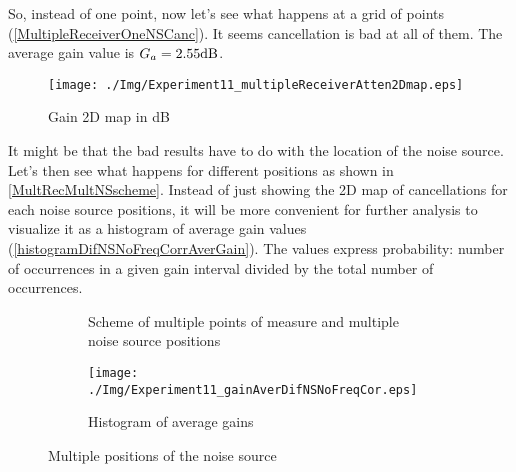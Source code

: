 So, instead of one point, now let's see what happens at a grid of points (\autoref{MultipleReceiverOneNSCanc}). It seems cancellation is bad at all of them.  The average gain value is $\averageGain = 2.55 \si{dB}$.

\begin{figure}
	\centering			\texttt{[image: ./Img/Experiment11\_multipleReceiverAtten2Dmap.eps]}
	\caption[Gain 2D map]{Gain 2D map in dB}
	\label{MultipleReceiverOneNSCanc}
\end{figure}

It might be that the bad results have to do with the location of the noise source. Let's then see what happens for different positions as shown in \autoref{MultRecMultNSscheme}. Instead of just showing the 2D map of cancellations for each noise source positions, it will be more convenient for further analysis to visualize it as a histogram of 
average gain values (\autoref{histogramDifNSNoFreqCorrAverGain}). The values express probability: number of occurrences in a given gain interval divided by the total number of occurrences.

\begin{figure}
	\centering
	\begin{subfigure}[b]{0.49\textwidth}
	\centering
	\caption[Scheme of multiple points of measure and multiple noise source positions]{Scheme of multiple points of measure and multiple noise source positions}
	\label{MultRecMultNSscheme}
	\end{subfigure}
	\begin{subfigure}[b]{0.49\textwidth}
		\centering
		\texttt{[image: ./Img/Experiment11\_gainAverDifNSNoFreqCor.eps]}
		\caption{Histogram of average gains}
		\label{histogramDifNSNoFreqCorrAverGain}
	\end{subfigure}
	\caption{Multiple positions of the noise source}
\end{figure}


